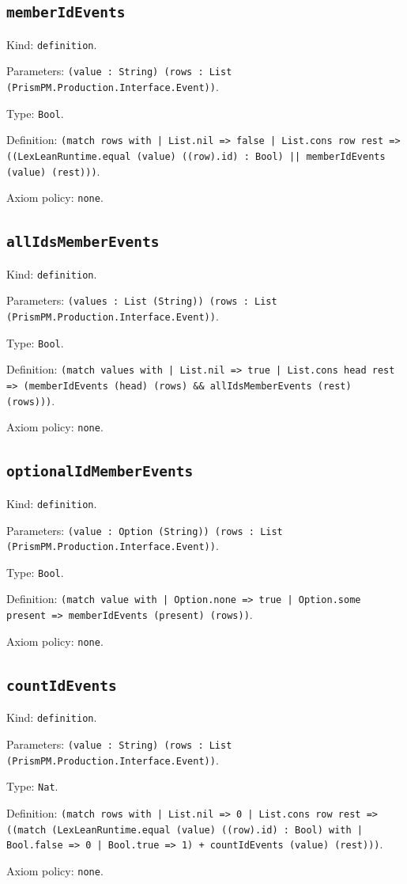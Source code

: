 \documentclass[11pt]{article}
\begin{document}
\subsection*{\texttt{memberIdEvents}}
\noindent Kind: \texttt{definition}.\par
\noindent Parameters: \texttt{(value : String) (rows : List (PrismPM.Production.Interface.Event))}.\par
\noindent Type: \texttt{Bool}.\par
\noindent Definition: \texttt{(match rows with | List.nil => false | List.cons row rest => ((LexLeanRuntime.equal (value) ((row).id) : Bool) || memberIdEvents (value) (rest)))}.\par
\noindent Axiom policy: \texttt{none}.\par
\subsection*{\texttt{allIdsMemberEvents}}
\noindent Kind: \texttt{definition}.\par
\noindent Parameters: \texttt{(values : List (String)) (rows : List (PrismPM.Production.Interface.Event))}.\par
\noindent Type: \texttt{Bool}.\par
\noindent Definition: \texttt{(match values with | List.nil => true | List.cons head rest => (memberIdEvents (head) (rows) \&\& allIdsMemberEvents (rest) (rows)))}.\par
\noindent Axiom policy: \texttt{none}.\par
\subsection*{\texttt{optionalIdMemberEvents}}
\noindent Kind: \texttt{definition}.\par
\noindent Parameters: \texttt{(value : Option (String)) (rows : List (PrismPM.Production.Interface.Event))}.\par
\noindent Type: \texttt{Bool}.\par
\noindent Definition: \texttt{(match value with | Option.none => true | Option.some present => memberIdEvents (present) (rows))}.\par
\noindent Axiom policy: \texttt{none}.\par
\subsection*{\texttt{countIdEvents}}
\noindent Kind: \texttt{definition}.\par
\noindent Parameters: \texttt{(value : String) (rows : List (PrismPM.Production.Interface.Event))}.\par
\noindent Type: \texttt{Nat}.\par
\noindent Definition: \texttt{(match rows with | List.nil => 0 | List.cons row rest => ((match (LexLeanRuntime.equal (value) ((row).id) : Bool) with | Bool.false => 0 | Bool.true => 1) + countIdEvents (value) (rest)))}.\par
\noindent Axiom policy: \texttt{none}.\par
\end{document}
